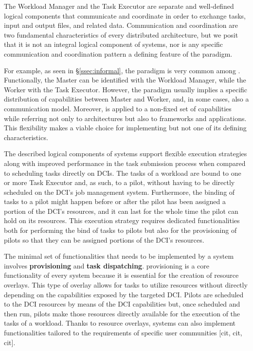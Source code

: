 \documentclass{sig-alternate}
\begin{document}
The Workload Manager and the Task Executor are separate and well-defined
logical components that communicate and coordinate in order to exchange tasks,
input and output files, and related data. Communication and coordination are
two fundamental characteristics of every distributed architecture, but we posit
that it is not an integral logical component of \pilotjob systems, nor is any
specific communication and coordination pattern a defining feature of the
\pilotjob paradigm.

For example, as seen in \S\ref{ssec:informal}, the \MW paradigm is very common
among \pilotjobs. Functionally, the Master can be identified with the Workload
Manager, while the Worker with the Task Executor. However, the \MW paradigm
usually implies a specific distribution of capabilities between Master and
Worker, and, in some cases, also a communication model. Moreover, \MW is
applied to a non-fixed set of capabilities while referring not only to
architectures but also to frameworks and applications. This flexibility makes
\MW a viable choice for implementing \pilotjobs but not one of its defining
characteristics.

The described logical components of \pilotjob systems support flexible
execution strategies along with improved performance in the task submission
process when compared to scheduling tasks directly on DCIs. The tasks of a
workload are bound to one or more Task Executor and, as such, to a pilot,
without having to be directly scheduled on the DCI's job management system.
Furthermore, the binding of tasks to a pilot might
happen before or after the pilot has been assigned a portion of the DCI's
resources, and it can last for the whole time the pilot can hold on its
resources. This execution strategy requires dedicated functionalities both for
performing the bind of tasks to pilots but also for the provisioning of pilots
so that they can be assigned portions of the DCI's resources.

The minimal set of functionalities that needs to be implemented by a \pilotjob
system involves \textbf{\pilot provisioning} and \textbf{task dispatching}.
\pilot provisioning is a core functionality of every \pilot system because it
is essential for the creation of resource overlays. This type of overlay allows
for tasks to utilize resources without directly depending on the capabilities
exposed by the targeted DCI. Pilots are scheduled to the DCI resources by means
of the DCI capabilities but, once scheduled and then run, pilots make those
resources directly available for the execution of the tasks of a workload.
Thanks to resource overlays, \pilot systems can also implement functionalities
tailored to the requirements of specific user communities [cit, cit, cit].
\end{document}
